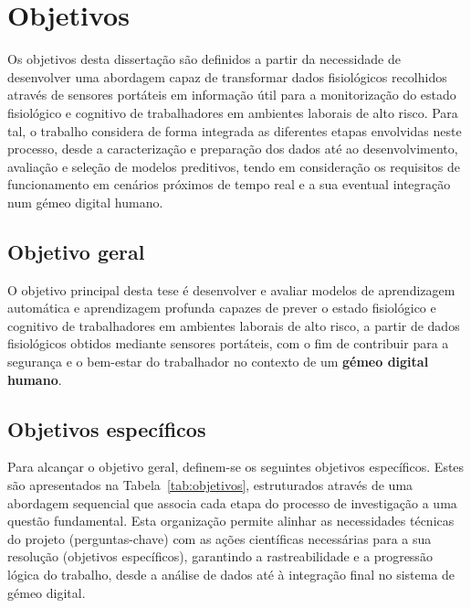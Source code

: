 \section{Objetivos}
\label{sec:objetivos}

Os objetivos desta dissertação são definidos a partir da necessidade de desenvolver uma abordagem capaz de transformar dados fisiológicos recolhidos através de sensores portáteis em informação útil para a monitorização do estado fisiológico e cognitivo de trabalhadores em ambientes laborais de alto risco. Para tal, o trabalho considera de forma integrada as diferentes etapas envolvidas neste processo, desde a caracterização e preparação dos dados até ao desenvolvimento, avaliação e seleção de modelos preditivos, tendo em consideração os requisitos de funcionamento em cenários próximos de tempo real e a sua eventual integração num gémeo digital humano.

\subsection*{Objetivo geral}

O objetivo principal desta tese é desenvolver e avaliar modelos de aprendizagem automática e aprendizagem profunda capazes de prever o estado fisiológico e cognitivo de trabalhadores em ambientes laborais de alto risco, a partir de dados fisiológicos obtidos mediante sensores portáteis, com o fim de contribuir para a segurança e o bem-estar do trabalhador no contexto de um \textbf{gémeo digital humano}.

\subsection*{Objetivos específicos}

Para alcançar o objetivo geral, definem-se os seguintes objetivos específicos. Estes são apresentados na Tabela~\ref{tab:objetivos}, estruturados através de uma abordagem sequencial que associa cada etapa do processo de investigação a uma questão fundamental. Esta organização permite alinhar as necessidades técnicas do projeto (perguntas-chave) com as ações científicas necessárias para a sua resolução (objetivos específicos), garantindo a rastreabilidade e a progressão lógica do trabalho, desde a análise de dados até à integração final no sistema de gémeo digital.

